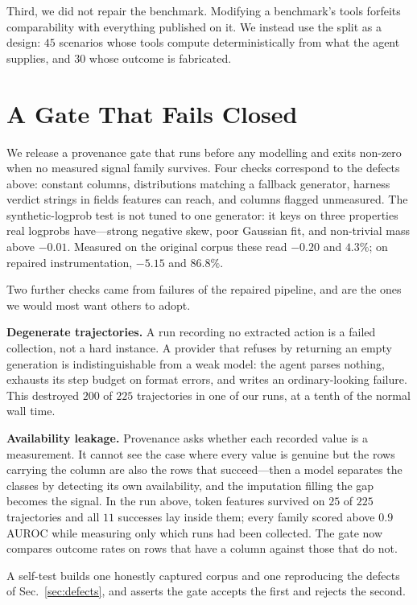 \documentclass[conference]{IEEEtran}
\begin{document}
Third, we did not repair the benchmark. Modifying a benchmark's tools forfeits
comparability with everything published on it. We instead use the split as a
design: $45$ scenarios whose tools compute deterministically from what the agent
supplies, and $30$ whose outcome is fabricated.

\section{A Gate That Fails Closed}

We release a provenance gate that runs before any modelling and exits non-zero
when no measured signal family survives. Four checks correspond to the defects
above: constant columns, distributions matching a fallback generator,
harness verdict strings in fields features can reach, and columns flagged
unmeasured. The synthetic-logprob test is not tuned to one generator: it keys on
three properties real logprobs have---strong negative skew, poor Gaussian fit,
and non-trivial mass above $-0.01$. Measured on the original corpus these read
$-0.20$ and $4.3\%$; on repaired instrumentation, $-5.15$ and $86.8\%$.

Two further checks came from failures of the repaired pipeline, and are the ones
we would most want others to adopt.

\textbf{Degenerate trajectories.} A run recording no extracted action is a
failed collection, not a hard instance. A provider that refuses by returning an
empty generation is indistinguishable from a weak model: the agent parses
nothing, exhausts its step budget on format errors, and writes an
ordinary-looking failure. This destroyed $200$ of $225$ trajectories in one of
our runs, at a tenth of the normal wall time.

\textbf{Availability leakage.} Provenance asks whether each recorded value is a
measurement. It cannot see the case where every value is genuine but the rows
carrying the column are also the rows that succeed---then a model separates the
classes by detecting its own availability, and the imputation filling the gap
becomes the signal. In the run above, token features survived on $25$ of $225$
trajectories and all $11$ successes lay inside them; every family scored above
$0.9$ AUROC while measuring only which runs had been collected. The gate now
compares outcome rates on rows that have a column against those that do not.

A self-test builds one honestly captured corpus and one reproducing the defects
of Sec.~\ref{sec:defects}, and asserts the gate accepts the first and rejects
the second.
\end{document}
